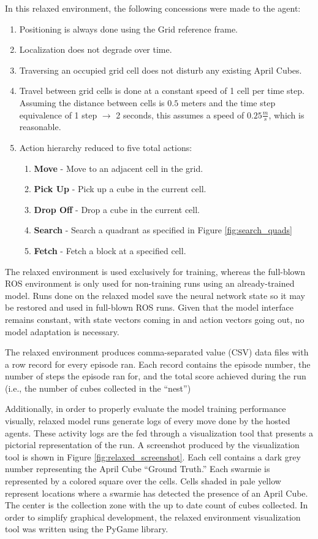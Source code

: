 \documentclass[sigconf,authordraft]{acmart}
\begin{document}
In this relaxed environment, the following concessions were made to the agent:

\begin{enumerate}
  \item Positioning is always done using the Grid reference frame.
  \item Localization does not degrade over time.
  \item Traversing an occupied grid cell does not disturb any existing April Cubes.
  \item Travel between grid cells is done at a constant speed of 1 cell per time step. Assuming the distance between cells is $0.5$ meters and the time step equivalence of 1 step $\rightarrow$ 2 seconds, this assumes a speed of $0.25 \tfrac{m}{s}$, which is reasonable.
  \item Action hierarchy reduced to five total actions:
  \begin{enumerate}
    \item \textbf{Move} - Move to an adjacent cell in the grid.
    \item \textbf{Pick Up} - Pick up a cube in the current cell.
    \item \textbf{Drop Off} - Drop a cube in the current cell.
    \item \textbf{Search} - Search a quadrant as specified in Figure \ref{fig:search_quads}
    \item \textbf{Fetch} - Fetch a block at a specified cell.
  \end{enumerate}
\end{enumerate}

The relaxed environment is used exclusively for training, whereas the full-blown ROS environment is only used for non-training runs using an already-trained model. Runs done on the relaxed model save the neural network state so it may be restored and used in full-blown ROS runs. Given that the model interface remains constant, with state vectors coming in and action vectors going out, no model adaptation is necessary.

The relaxed environment produces comma-separated value (CSV) data files with a row record for every episode ran. Each record contains the episode number, the number of steps the episode ran for, and the total score achieved during the run (i.e., the number of cubes collected in the ``nest'')

Additionally, in order to properly evaluate the model training performance visually, relaxed model runs generate logs of every move done by the hosted agents. These activity logs are the fed through a visualization tool that presents a pictorial representation of the run. A screenshot produced by the visualization tool is shown in Figure \ref{fig:relaxed_screenshot}. Each cell contains a dark grey number representing the April Cube ``Ground Truth.'' Each swarmie is represented by a colored square over the cells. Cells shaded in pale yellow represent locations where a swarmie has detected the presence of an April Cube. The center is the collection zone with the up to date count of cubes collected. In order to simplify graphical development, the relaxed environment visualization tool was written using the PyGame library.
\end{document}
